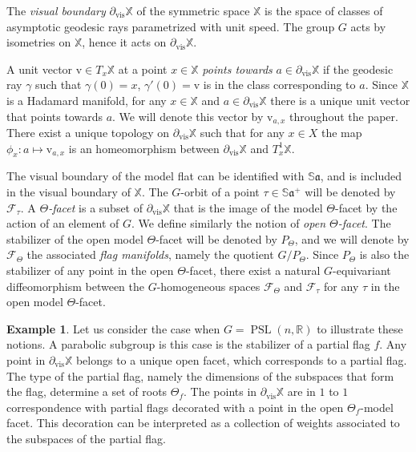 \documentclass[reqno,10pt]{amsart}
\theoremstyle{plain}
\theoremstyle{definition}
\newtheorem{exmp}[thm]{Example}
\theoremstyle{remark}
\newcommand{\type}{\tau}
\newcommand{\R}{\mathbb{R}}
\newcommand{\Sph}{\mathbb{S}}
\DeclareMathOperator{\vis}{vis}
\newcommand{\partialvis}{\partial_{\vis}}
\DeclareMathOperator{\PSL}{PSL}
\newcommand{\X}{\mathbb{X}}
\newcommand{\ie}{namely }
\begin{document}
\medskip

The \emph{visual boundary} $\partialvis\X$ of the symmetric space $\X$ is the space of classes of asymptotic geodesic rays parametrized with unit speed. The group $G$ acts by isometries on $\X$, hence it acts on $\partialvis \X$.


A unit vector $\mathrm{v}\in T_x\X$ at a point $x\in \X$ \emph{points towards} $a\in \partialvis \X$ if the geodesic ray $\gamma$ such that $\gamma(0)=x$, $\gamma'(0)=\mathrm{v}$ is in the class corresponding to $a$. Since $\X$ is a Hadamard manifold, for any $x\in \X$ and $a\in \partialvis \X$ there is a unique unit vector that points towards $a$. We will denote this vector by $\mathrm{v}_{a,x}$ throughout the paper.
There exist a unique topology on $\partialvis \X$ such that for any $x\in X$ the map $\phi_x:a\mapsto \mathrm{v}_{a,x}$ is an homeomorphism between $\partialvis \X$ and $T^1_x\X$.

\medskip

The visual boundary of the model flat can be identified with $\Sph\mathfrak{a}$, and is included in the visual boundary of $\X$. The $G$-orbit of a point $\type\in \Sph\mathfrak{a}^+$ will be denoted by $\mathcal{F}_\type$.
 A \emph{$\Theta$-facet} is a subset of $\partialvis \X$ that is the image of the model $\Theta$-facet by the action of an element of $G$. We define similarly the notion of \emph{open $\Theta$-facet}. The stabilizer of the open model $\Theta$-facet will be denoted by $P_\Theta$, and we will denote by $\mathcal{F}_\Theta$ the associated \emph{flag manifolds}, \ie the quotient $G/P_\Theta$. Since $P_\Theta$ is also the stabilizer of any point in the open $\Theta$-facet, there exist a natural $G$-equivariant diffeomorphism between the $G$-homogeneous spaces $\mathcal{F}_\Theta$ and $\mathcal{F}_\type$ for any $\type$ in the open model $\Theta$-facet.
 
\begin{exmp}
Let us consider the case when $G=\PSL(n,\R)$ to illustrate these notions. A parabolic subgroup is this case is the stabilizer of a partial flag $f$. Any point in $\partialvis \X$ belongs to a unique open facet, which corresponds to a partial flag. The type of the partial flag, \ie the dimensions of the subspaces that form the flag, determine a set of roots $\Theta_f$. The points in $\partialvis \X$ are in $1$ to $1$ correspondence with partial flags decorated with a point in the open $\Theta_f$-model facet. This decoration can be interpreted as a collection of weights associated to the subspaces of the partial flag.
\end{exmp}
\end{document}
